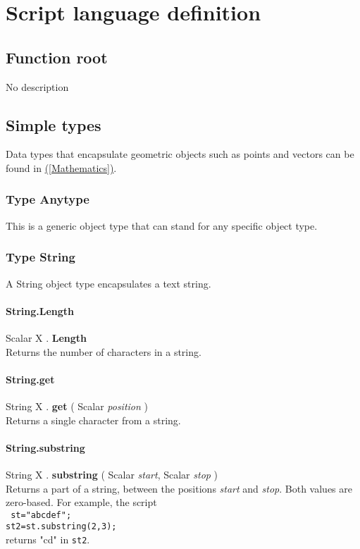 \documentclass[10pt]{book}
\newcommand{\linkitem}[1]{\hyperref[#1]{\nameref{#1} (\ref{#1})}}
\newcommand{\sourcecode}[1]{\texttt{#1}}
\newcommand{\var}[1]{\textit{#1}}
\begin{document}
\chapter{Script language definition}
\section{Function root \label{}}
No description

\section{Simple types \label{Simple types}}

Data types that encapsulate geometric objects such as points and vectors can be found in \linkitem{Mathematics}.

\subsection{Type Anytype \label{T:Anytype}}
This is a generic object type that can stand for any specific object type.

\subsection{Type String \label{T:String}}
A String object type encapsulates a text string.

\subsubsection{String.Length \label{F:String:Length}}
Scalar X . \textbf{Length} \\
Returns the number of characters in a string.

\subsubsection{String.get \label{F:String:get}}
String X . \textbf{get} ( Scalar \textit{position} ) \\
Returns a single character from a string.

\subsubsection{String.substring \label{F:String:substring}}
String X . \textbf{substring} ( Scalar \textit{start}, Scalar \textit{stop} ) \\
Returns a part of a string, between the positions \var{start} and \var{stop}. Both values are zero-based. For example, the script \\
\sourcecode{
st="abcdef"; \\
st2=st.substring(2,3);
} \\
returns "cd" in \sourcecode{st2}.
\end{document}
